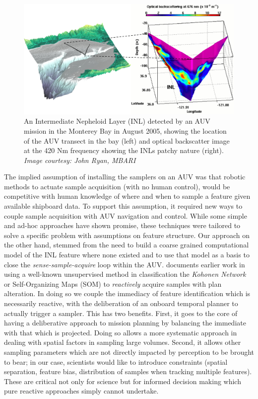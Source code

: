 \begin{figure}[htpb]
\centering
\includegraphics[scale=0.65]{figs/inl.jpg}
\caption{\small An Intermediate Nepheloid Layer (INL) detected by an
  AUV mission in the Monterey Bay in August 2005, showing the location
  of the AUV transect in the bay (left) and optical backscatter image
  at the 420 Nm frequency showing the INLs patchy nature
  (right). \emph{Image courtesy: John Ryan, MBARI}}
\label{fig:inl}
\end{figure}

The implied assumption of installing the samplers on an AUV was that
robotic methods to actuate sample acquisition (with no human control),
would be competitive with human knowledge of where and when to sample
a feature given available shipboard data. To support this assumption,
it required new ways to couple sample acquisition with AUV navigation
and control. While some simple and ad-hoc approaches \cite{yanwu10,
  yanwu11} have shown promise, these techniques were tailored to solve
a specific problem with assumptions on feature structure.  Our
approach on the other hand, stemmed from the need to build a coarse
grained computational model of the INL feature where none existed and
to use that model as a basis to close the \emph{sense-sample-acquire}
loop within the AUV. \cite{fox2007} documents earlier work in using a
well-known unsupervised method in classification the \emph{Kohonen
  Network} or Self-Organizing Maps (SOM) \cite{kohonen} to
\emph{reactively} acquire samples with plan alteration. In doing so we
couple the immediacy of feature identification which is necessarily
reactive, with the deliberation of an onboard temporal planner to
actually trigger a sampler. This has two benefits. First, it goes to
the core of having a deliberative approach to mission planning by
balancing the immediate with that which is projected. Doing so allows
a more systematic approach in dealing with spatial factors in sampling
large volumes. Second, it allows other sampling parameters which are
not directly impacted by perception to be brought to bear; in our
case, scientists would like to introduce constraints (spatial
separation, feature bias, distribution of samples when tracking
multiple features). These are critical not only for science but for
informed decision making which pure reactive approaches simply cannot
undertake.


